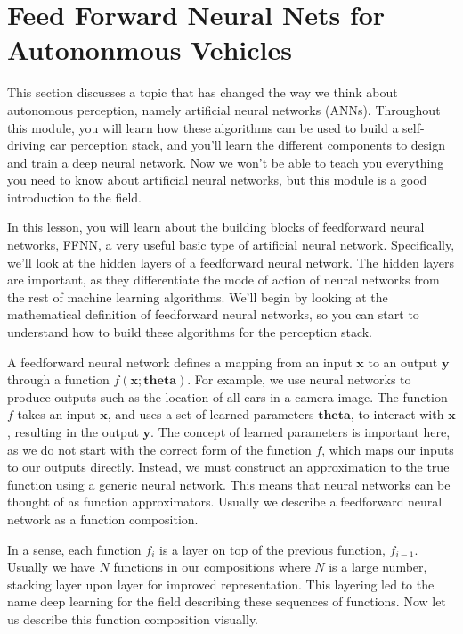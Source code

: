 \section{Feed Forward Neural Nets for Autononmous Vehicles}
\label{feed_forward_neural_nets_autononmous_vehicles}

This section discusses a topic that has changed the way we think about autonomous perception, namely
artificial neural networks (ANNs). Throughout this module, you will learn
how these algorithms can be used to build a self-driving car perception stack, and you'll learn the different components to
design and train a deep neural network. Now we won't be able to teach you
everything you need to know about artificial neural networks, but this module is a good
introduction to the field. 


In this lesson, you will learn about the building blocks of feedforward neural networks, FFNN, a very useful
basic type of artificial neural network. Specifically, we'll look at the hidden
layers of a feedforward neural network. The hidden layers are important, as they
differentiate the mode of action of neural networks from the rest of
machine learning algorithms. We'll begin by looking at the mathematical
definition of feedforward neural networks, so you can start to understand
how to build these algorithms for the perception stack. 

A feedforward neural network defines a mapping from an input $\mathbf{x}$ to an output $\mathbf{y}$ through
a function $f(\mathbf{x}; \boldsymbol{theta})$. For example, we use neural networks
to produce outputs such as the location of all cars in a camera image. The function $f$ takes an input $\mathbf{x}$, and
uses a set of learned parameters $\boldsymbol{theta}$, to interact with $\mathbf{x}$,
resulting in the output $\mathbf{y}$. The concept of learned parameters is
important here, as we do not start with the correct form of the function $f$, which
maps our inputs to our outputs directly. Instead, we must construct an
approximation to the true function using a generic neural network. This means that neural networks can be
thought of as function approximators. Usually we describe a feedforward neural
network as a function composition. 

In a sense,
each function $f_i$ is a layer on top of the previous function, $f_{i- 1}$. Usually we have $N$ functions in our
compositions where $N$ is a large number, stacking layer upon layer for
improved representation. This layering led to
the name deep learning for the field describing these
sequences of functions. Now let us describe this
function composition visually. 


